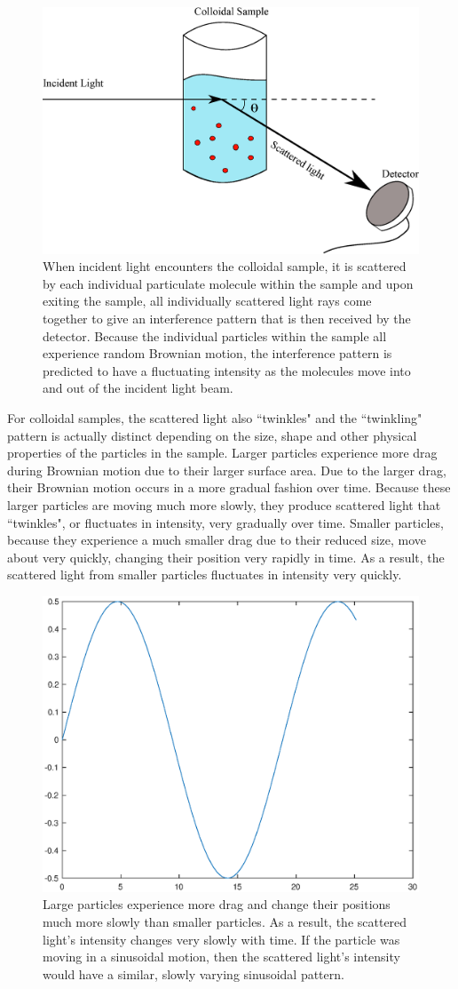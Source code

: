 \documentclass[11pt]{article}
\begin{document}
\begin{figure}
\centering
\includegraphics[width=0.8\linewidth]{dls-general-setup.eps}
\caption{When incident light encounters the colloidal sample, it is scattered by each individual particulate molecule within the sample and upon exiting the sample, all individually scattered light rays come together to give an interference pattern that is then received by the detector. Because the individual particles within the sample all experience random Brownian motion, the interference pattern is predicted to have a fluctuating intensity as the molecules move into and out of the incident light beam.}
\label{fig:dls-general-setup}
\end{figure}


For colloidal samples, the scattered light also ``twinkles" and the ``twinkling" pattern is actually distinct depending on the size, shape and other physical properties of the particles in the sample. Larger particles experience more drag during Brownian motion due to their larger surface area. Due to the larger drag, their Brownian motion occurs in a more gradual fashion over time. Because these larger particles are moving much more slowly, they produce scattered light that ``twinkles", or fluctuates in intensity, very gradually over time. Smaller particles, because they experience a much smaller drag due to their reduced size, move about very quickly, changing their position very rapidly in time. As a result, the scattered light from smaller particles fluctuates in intensity very quickly. 

\begin{figure}
\centering
\includegraphics[width=0.4\linewidth]{large-particle-intensity.eps}
\caption{Large particles experience more drag and change their positions much more slowly than smaller particles. As a result, the scattered light's intensity changes very slowly with time. If the particle was moving in a sinusoidal motion, then the scattered light's intensity would have a similar, slowly varying sinusoidal pattern.}
\label{fig:large-particle-intensity}
\end{figure}
\end{document}
